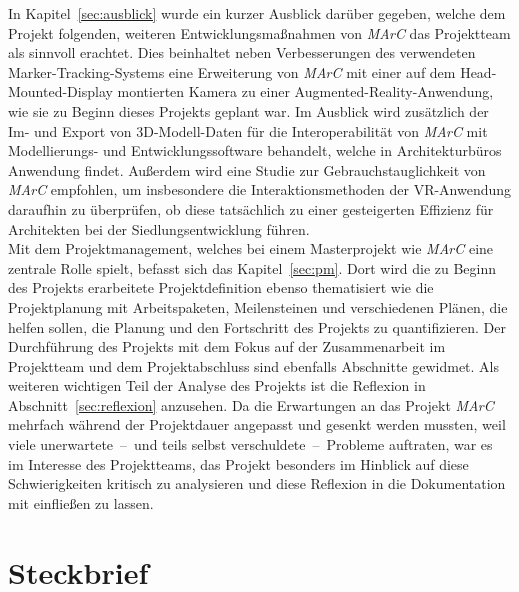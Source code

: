 In Kapitel~\ref{sec:ausblick} wurde ein kurzer Ausblick darüber gegeben, welche dem Projekt folgenden, weiteren Entwicklungsmaßnahmen von \emph{MArC} das Projektteam als sinnvoll erachtet. Dies beinhaltet neben Verbesserungen des verwendeten Marker-Tracking-Systems eine Erweiterung von \emph{MArC} mit einer auf dem Head-Mounted-Display montierten Kamera zu einer Augmented-Reality-Anwendung, wie sie zu Beginn dieses Projekts geplant war. Im Ausblick wird zusätzlich der Im- und Export von 3D-Modell-Daten für die Interoperabilität von \emph{MArC} mit Modellierungs- und Entwicklungssoftware behandelt, welche in Architekturbüros Anwendung findet. Außerdem wird eine Studie zur Gebrauchstauglichkeit von \emph{MArC} empfohlen, um insbesondere die Interaktionsmethoden der VR-Anwendung daraufhin zu überprüfen, ob diese tatsächlich zu einer gesteigerten Effizienz für Architekten bei der Siedlungsentwicklung führen.\\
Mit dem Projektmanagement, welches bei einem Masterprojekt wie \emph{MArC} eine zentrale Rolle spielt, befasst sich das Kapitel~\ref{sec:pm}. Dort wird die zu Beginn des Projekts erarbeitete Projektdefinition ebenso thematisiert wie die Projektplanung mit Arbeitspaketen, Meilensteinen und verschiedenen Plänen, die helfen sollen, die Planung und den Fortschritt des Projekts zu quantifizieren. Der Durchführung des Projekts mit dem Fokus auf der Zusammenarbeit im Projektteam und dem Projektabschluss sind ebenfalls Abschnitte gewidmet. Als weiteren wichtigen Teil der Analyse des Projekts ist die Reflexion in Abschnitt~\ref{sec:reflexion} anzusehen. Da die Erwartungen an das Projekt \emph{MArC} mehrfach während der Projektdauer angepasst und gesenkt werden mussten, weil viele unerwartete~--~und teils selbst verschuldete~--~Probleme auftraten, war es im Interesse des Projektteams, das Projekt besonders im Hinblick auf diese Schwierigkeiten kritisch zu analysieren und diese Reflexion in die Dokumentation mit einfließen zu lassen.

\section{Steckbrief}